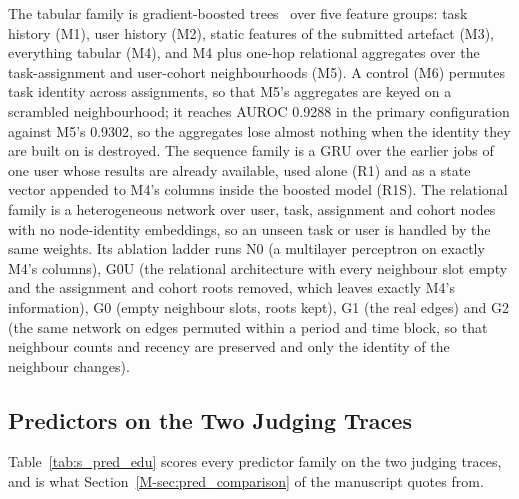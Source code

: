 \documentclass[mathematics,supfile,submit,moreauthors]{Definitions/mdpi}
\newcommand{\devnum}[1]{#1}
\begin{document}
The tabular family is gradient-boosted trees~\cite{ke2017lightgbm} over five feature groups:
task history (M1), user history (M2), static features of the submitted artefact (M3),
everything tabular (M4), and M4 plus one-hop relational aggregates over the
task-assignment and user-cohort neighbourhoods (M5). A control (M6) permutes task
identity across assignments, so that M5's aggregates are keyed on a scrambled
neighbourhood; it reaches AUROC \devnum{0.9288} in the primary configuration against
M5's \devnum{0.9302}, so the aggregates lose almost nothing when the identity they are
built on is destroyed. The sequence family is a GRU over the earlier jobs of one
user whose results are already available, used alone (R1) and as a state vector appended
to M4's columns inside the boosted model (R1S). The relational family is a heterogeneous
network over user, task, assignment and cohort nodes~\cite{schlichtkrull2018rgcn} with no
node-identity embeddings, so an unseen task or user is handled by the same weights. Its
ablation ladder runs N0 (a multilayer perceptron on exactly M4's columns), G0U (the
relational architecture with every neighbour slot empty and the assignment and cohort
roots removed, which leaves exactly M4's information), G0 (empty neighbour slots, roots
kept), G1 (the real edges) and G2 (the same network on edges permuted within a period and
time block, so that neighbour counts and recency are preserved and only the identity of
the neighbour changes).


\subsection{Predictors on the Two Judging Traces}
\label{sec:supp_pred_edu}

Table~\ref{tab:s_pred_edu} scores every predictor family on the two judging traces, and
is what Section~\ref*{M-sec:pred_comparison} of the manuscript quotes from.
\end{document}
